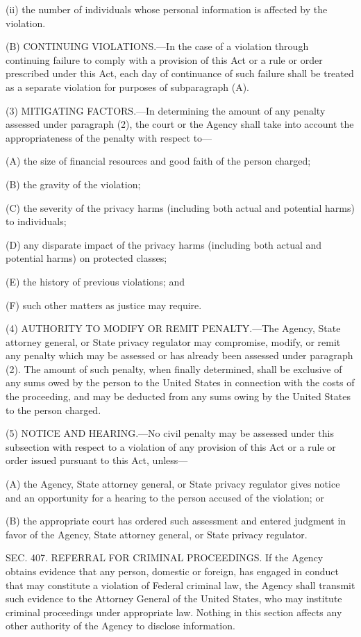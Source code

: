 (ii) the number of individuals whose personal information is affected by the violation.

(B) CONTINUING VIOLATIONS.—In the case of a violation through continuing failure to comply with a provision of this Act or a rule or order prescribed under this Act, each day of continuance of such failure shall be treated as a separate violation for purposes of subparagraph (A).

(3) MITIGATING FACTORS.—In determining the amount of any penalty assessed under paragraph (2), the court or the Agency shall take into account the appropriateness of the penalty with respect to—

(A) the size of financial resources and good faith of the person charged;

(B) the gravity of the violation;

(C) the severity of the privacy harms (including both actual and potential harms) to individuals;

(D) any disparate impact of the privacy harms (including both actual and potential harms) on protected classes;

(E) the history of previous violations; and

(F) such other matters as justice may require.

(4) AUTHORITY TO MODIFY OR REMIT PENALTY.—The Agency, State attorney general, or State privacy regulator may compromise, modify, or remit any penalty which may be assessed or has already been assessed under paragraph (2). The amount of such penalty, when finally determined, shall be exclusive of any sums owed by the person to the United States in connection with the costs of the proceeding, and may be deducted from any sums owing by the United States to the person charged.

(5) NOTICE AND HEARING.—No civil penalty may be assessed under this subsection with respect to a violation of any provision of this Act or a rule or order issued pursuant to this Act, unless—

(A) the Agency, State attorney general, or State privacy regulator gives notice and an opportunity for a hearing to the person accused of the violation; or

(B) the appropriate court has ordered such assessment and entered judgment in favor of the Agency, State attorney general, or State privacy regulator.


SEC. 407. REFERRAL FOR CRIMINAL PROCEEDINGS.
If the Agency obtains evidence that any person, domestic or foreign, has engaged in conduct that may constitute a violation of Federal criminal law, the Agency shall transmit such evidence to the Attorney General of the United States, who may institute criminal proceedings under appropriate law. Nothing in this section affects any other authority of the Agency to disclose information.


